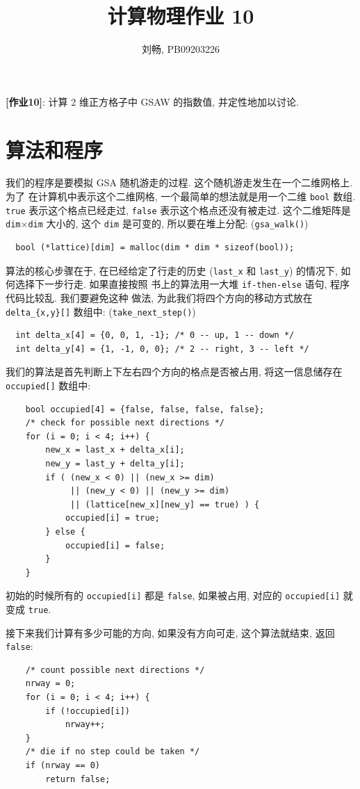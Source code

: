 \documentclass{ctexart}
\begin{document}
\title{计算物理作业 10}
\author{刘畅, PB09203226}
\maketitle

{\bf [作业10]}: 计算 2 维正方格子中 GSAW 的指数值, 并定性地加以讨论.

\section{算法和程序}
我们的程序是要模拟 GSA 随机游走的过程. 这个随机游走发生在一个二维网格上. 为了
在计算机中表示这个二维网格, 一个最简单的想法就是用一个二维 \verb|bool| 数组.
\verb|true| 表示这个格点已经走过, \verb|false| 表示这个格点还没有被走过.
这个二维矩阵是 \verb|dim|$\times$\verb|dim| 大小的, 这个 \verb|dim| 是可变的,
所以要在堆上分配: (\verb|gsa_walk()|)
\begin{verbatim}
  bool (*lattice)[dim] = malloc(dim * dim * sizeof(bool));
\end{verbatim}

算法的核心步骤在于, 在已经给定了行走的历史 (\verb|last_x| 和 \verb|last_y|)
的情况下, 如何选择下一步行走. 如果直接按照
书上的算法用一大堆 \verb|if-then-else| 语句, 程序代码比较乱. 我们要避免这种
做法, 为此我们将四个方向的移动方式放在 \verb|delta_{x,y}[]| 数组中:
(\verb|take_next_step()|)
\begin{verbatim}
  int delta_x[4] = {0, 0, 1, -1}; /* 0 -- up, 1 -- down */
  int delta_y[4] = {1, -1, 0, 0}; /* 2 -- right, 3 -- left */
\end{verbatim}
我们的算法是首先判断上下左右四个方向的格点是否被占用, 将这一信息储存在 \verb|occupied[]|
数组中:
\begin{verbatim}
    bool occupied[4] = {false, false, false, false};
    /* check for possible next directions */
    for (i = 0; i < 4; i++) {
        new_x = last_x + delta_x[i];
        new_y = last_y + delta_y[i];
        if ( (new_x < 0) || (new_x >= dim)
             || (new_y < 0) || (new_y >= dim)
             || (lattice[new_x][new_y] == true) ) {
            occupied[i] = true;
        } else {
            occupied[i] = false;
        }
    }
\end{verbatim}
初始的时候所有的 \verb|occupied[i]| 都是 \verb|false|, 如果被占用, 对应的
\verb|occupied[i]| 就变成 \verb|true|.

接下来我们计算有多少可能的方向, 如果没有方向可走, 这个算法就结束, 返回 \verb|false|:
\begin{verbatim}
    /* count possible next directions */
    nrway = 0;
    for (i = 0; i < 4; i++) {
        if (!occupied[i])
            nrway++;
    }
    /* die if no step could be taken */
    if (nrway == 0)
        return false;
\end{verbatim}
\end{document}
